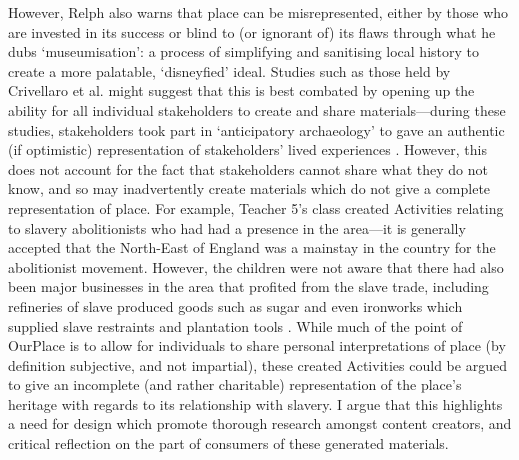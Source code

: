 However, Relph also warns that place can be misrepresented, either by those who are invested in its success or blind to (or ignorant of) its flaws through what he dubs `museumisation': a process of simplifying and sanitising local history to create a more palatable, `disneyfied' ideal. Studies such as those held by Crivellaro et al. might suggest that this is best combated by opening up the ability for all individual stakeholders to create and share materials---during these studies, stakeholders took part in `anticipatory archaeology' to gave an authentic (if optimistic) representation of stakeholders' lived experiences \citep{Crivellaro2016}. However, this does not account for the fact that stakeholders cannot share what they do not know, and so may inadvertently create materials which do not give a complete representation of place. For example, Teacher 5's class created Activities relating to slavery abolitionists who had had a presence in the area---it is generally accepted that the North-East of England was a mainstay in the country for the abolitionist movement. However, the children were not aware that there had also been major businesses in the area that profited from the slave trade, including refineries of slave produced goods such as sugar and even ironworks which supplied slave restraints and plantation tools \citep{LitPhil2007}. While much of the point of OurPlace is to allow for individuals to share personal interpretations of place (by definition subjective, and not impartial), these created Activities could be argued to give an incomplete (and rather charitable) representation of the place's heritage with regards to its relationship with slavery. I argue that this highlights a need for design which promote thorough research amongst content creators, and critical reflection on the part of consumers of these generated materials.

